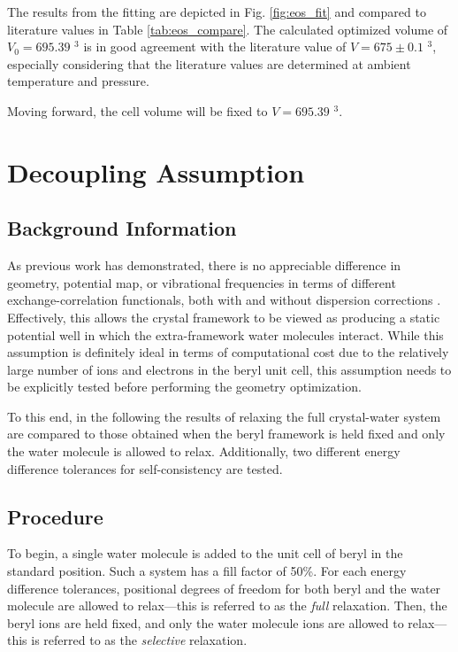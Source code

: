         The results from the fitting are depicted in Fig. \ref{fig:eos_fit} and compared to literature values in Table \ref{tab:eos_compare}. The calculated optimized volume of $V_0 = 695.39$ \angstrom$^3$ is in good agreement with the literature value of $V=675\pm0.1$ \angstrom$^3$, especially considering that the literature values are determined at ambient temperature and pressure. 
        
        Moving forward, the cell volume will be fixed to $V=695.39$ \angstrom$^3$.
    \section{Decoupling Assumption}
    \label{sec:da}
        \subsection{Background Information}
            As previous work has demonstrated, there is no appreciable difference in geometry, potential map, or vibrational frequencies in terms of different exchange-correlation functionals, both with and without dispersion corrections \cite{vibr_states}. Effectively, this allows the crystal framework to be viewed as producing a static potential well in which the extra-framework water molecules interact. While this assumption is definitely ideal in terms of computational cost due to the relatively large number of ions and electrons in the beryl unit cell, this assumption needs to be explicitly tested before performing the geometry optimization.
            
            To this end, in the following the results of relaxing the full crystal-water system are compared to those obtained when the beryl framework is held fixed and only the water molecule is allowed to relax. Additionally, two different energy difference tolerances for self-consistency are tested.
        \subsection{Procedure}
            To begin, a single water molecule is added to the unit cell of beryl in the standard position. Such a system has a fill factor of 50\%. For each energy difference tolerances, positional degrees of freedom for both beryl and the water molecule are allowed to relax---this is referred to as the \textit{full} relaxation. Then, the beryl ions are held fixed, and only the water molecule ions are allowed to relax---this is referred to as the \textit{selective} relaxation.
            
